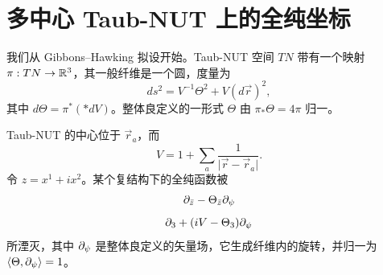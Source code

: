 
\section{多中心 Taub-NUT 上的全纯坐标}\label{app:HoloTN}

我们从 Gibbons--Hawking 拟设开始。Taub-NUT 空间 $TN$ 带有一个映射 $\pi: TN \to \mathbb{R}^3$，其一般纤维是一个圆，度量为
\begin{equation}
ds^2 = V^{-1} \Theta^2 + V (d\vec r)^2,
\end{equation}
其中 $d \Theta = \pi^*( *dV)$。整体良定义的一形式 $\Theta$ 由 $\pi_* \Theta = 4\pi$ 归一。

Taub-NUT 的中心位于 $\vec r_a$，而
\begin{equation}
V = 1 + \sum_a \frac{1}{\vert \vec r - \vec r_a \vert}.
\end{equation}
令 $z=x^1 + i x^2$。某个复结构下的全纯函数被
\begin{equation}
\partial_{\bar z} - \Theta_{\bar z} \partial_\psi
\end{equation}
\begin{equation}
\partial_3 + (i V - \Theta_3) \partial_\psi
\end{equation}
所湮灭，其中 $\partial_\psi$ 是整体良定义的矢量场，它生成纤维内的旋转，并归一为 $\langle \Theta, \partial_\psi \rangle = 1$。

